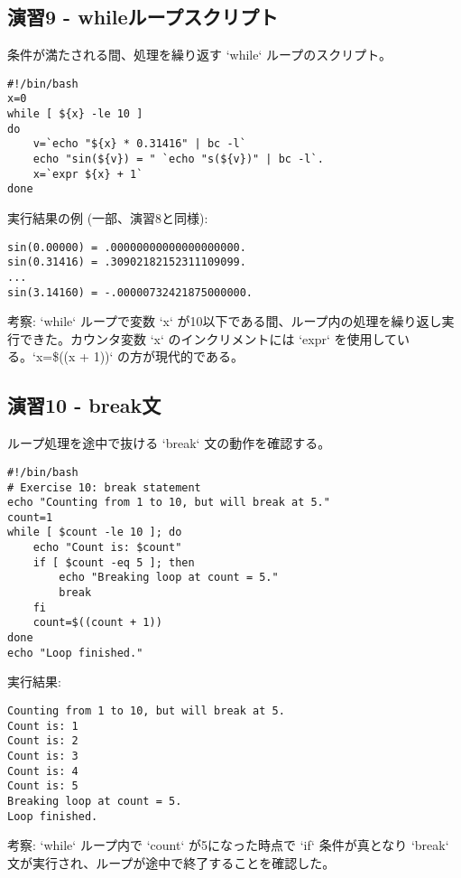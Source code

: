 \documentclass[a4paper,11pt]{jsarticle}
\begin{document}
\subsection*{演習9 - whileループスクリプト}
条件が満たされる間、処理を繰り返す `while` ループのスクリプト。
\begin{lstlisting}[caption=演習9 whileループのスクリプト例 (PDF記載例)]
#!/bin/bash
x=0
while [ ${x} -le 10 ]
do
    v=`echo "${x} * 0.31416" | bc -l`
    echo "sin(${v}) = " `echo "s(${v})" | bc -l`.
    x=`expr ${x} + 1`
done
\end{lstlisting}
実行結果の例 (一部、演習8と同様):
\begin{verbatim}
sin(0.00000) = .00000000000000000000.
sin(0.31416) = .30902182152311109099.
...
sin(3.14160) = -.00000732421875000000.
\end{verbatim}
考察: `while` ループで変数 `x` が10以下である間、ループ内の処理を繰り返し実行できた。カウンタ変数 `x` のインクリメントには `expr` を使用している。`x=\$((x + 1))` の方が現代的である。

\subsection*{演習10 - break文}
ループ処理を途中で抜ける `break` 文の動作を確認する。
\begin{lstlisting}[caption=演習10 break文のスクリプト例]
#!/bin/bash
# Exercise 10: break statement
echo "Counting from 1 to 10, but will break at 5."
count=1
while [ $count -le 10 ]; do
    echo "Count is: $count"
    if [ $count -eq 5 ]; then
        echo "Breaking loop at count = 5."
        break
    fi
    count=$((count + 1))
done
echo "Loop finished."
\end{lstlisting}
実行結果:
\begin{verbatim}
Counting from 1 to 10, but will break at 5.
Count is: 1
Count is: 2
Count is: 3
Count is: 4
Count is: 5
Breaking loop at count = 5.
Loop finished.
\end{verbatim}
考察: `while` ループ内で `count` が5になった時点で `if` 条件が真となり `break` 文が実行され、ループが途中で終了することを確認した。
\end{document}
